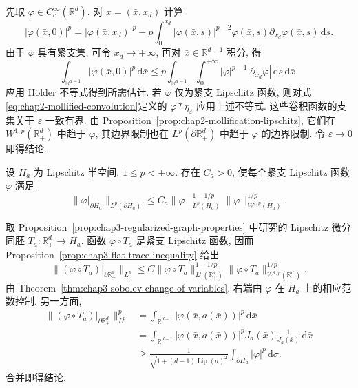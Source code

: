 \begin{Proof}
先取 $\varphi\in C_c^\infty(\mathbb R^d)$. 对 $x=(\bar x,x_d)$ 计算
\[
 |\varphi(\bar x,0)|^p=|\varphi(\bar x,x_d)|^p
 -p\int_0^{x_d}|\varphi(\bar x,s)|^{p-2}\varphi(\bar x,s)
 \partial_{x_d}\varphi(\bar x,s)\,\mathrm ds.
\]
由于 $\varphi$ 具有紧支集, 可令 $x_d\to+\infty$, 再对 $\bar x\in\mathbb R^{d-1}$ 积分, 得
\[
 \int_{\mathbb R^{d-1}}|\varphi(\bar x,0)|^p\,\mathrm d\bar x
 \leq p\int_{\mathbb R^{d-1}}\int_0^{+\infty}
 |\varphi|^{p-1}|\partial_{x_d}\varphi|\,\mathrm ds\,\mathrm d\bar x.
\]
应用 H\"older 不等式得到所需估计. 若 $\varphi$ 仅为紧支 Lipschitz 函数, 则对式\eqref{eq:chap2-mollified-convolution}定义的 $\varphi*\eta_\varepsilon$ 应用上述不等式. 这些卷积函数的支集关于 $\varepsilon$ 一致有界. 由 Proposition~\ref{prop:chap2-mollification-lipschitz}, 它们在 $W^{1,p}(\mathbb R_+^d)$ 中趋于 $\varphi$, 其边界限制也在 $L^p(\partial\mathbb R_+^d)$ 中趋于 $\varphi$ 的边界限制. 令 $\varepsilon\to0$ 即得结论.
\end{Proof}

\begin{Proposition}
\label{prop:chap3-half-space-trace-inequality}
设 $H_a$ 为 Lipschitz 半空间, $1\leq p<+\infty$. 存在 $C_a>0$, 使每个紧支 Lipschitz 函数 $\varphi$ 满足
\[
 \|\varphi|_{\partial H_a}\|_{L^p(\partial H_a)}
 \leq C_a\|\varphi\|_{L^p(H_a)}^{1-1/p}
 \|\varphi\|_{W^{1,p}(H_a)}^{1/p}.
\]
\end{Proposition}

\begin{Proof}
取 Proposition~\ref{prop:chap3-regularized-graph-properties} 中研究的 Lipschitz 微分同胚 $T_a:\mathbb R_+^d\to H_a$. 函数 $\varphi\circ T_a$ 是紧支 Lipschitz 函数, 因而 Proposition~\ref{prop:chap3-flat-trace-inequality} 给出
\[
 \|(\varphi\circ T_a)|_{\partial\mathbb R_+^d}\|_{L^p}
 \leq C\|\varphi\circ T_a\|_{L^p(\mathbb R_+^d)}^{1-1/p}
 \|\varphi\circ T_a\|_{W^{1,p}(\mathbb R_+^d)}^{1/p}.
\]
由 Theorem~\ref{thm:chap3-sobolev-change-of-variables}, 右端由 $\varphi$ 在 $H_a$ 上的相应范数控制. 另一方面,
\begin{align*}
 \|(\varphi\circ T_a)|_{\partial\mathbb R_+^d}\|_{L^p}^p
 &=\int_{\mathbb R^{d-1}}|\varphi(\bar x,a(\bar x))|^p\,\mathrm d\bar x\\
 &=\int_{\mathbb R^{d-1}}|\varphi(\bar x,a(\bar x))|^pJ_a(\bar x)
 \frac{1}{J_a(\bar x)}\,\mathrm d\bar x\\
 &\geq\frac{1}{\sqrt{1+(d-1)\operatorname{Lip}(a)^2}}
 \int_{\partial H_a}|\varphi|^p\,\mathrm d\sigma.
\end{align*}
合并即得结论.
\end{Proof}


